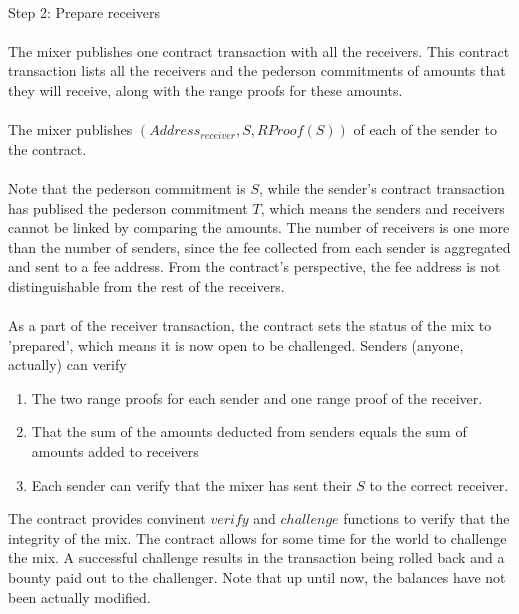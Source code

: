 \documentclass{article}
\begin{document}
\paragraph{}
Step 2: Prepare receivers
\paragraph{}
The mixer publishes one contract transaction with all the receivers. This contract transaction lists all the receivers and the pederson commitments of amounts that they will receive, along with the range proofs for these amounts. 
\paragraph{}
The mixer publishes $(Address_{receiver}, S, RProof(S))$ of each of the sender to the contract.
\paragraph{}
Note that the pederson commitment is $S$, while the sender's contract transaction has publised the pederson commitment $T$, which means the senders and receivers cannot be linked by comparing the amounts. 
The number of receivers is one more than the number of senders, since the fee collected from each sender is aggregated and sent to a fee address. From the contract's perspective, the fee address is not distinguishable from the rest of the receivers. 
\paragraph{}
As a part of the receiver transaction, the contract sets the status of the mix to 'prepared', which means it is now open to be challenged. Senders (anyone, actually) can verify 
\begin{enumerate}
\item The two range proofs for each sender and one range proof of the receiver.
\item That the sum of the amounts deducted from senders equals the sum of amounts added to receivers
\item Each sender can verify that the mixer has sent their $S$ to the correct receiver. 
\end{enumerate}
The contract provides convinent $verify$ and $challenge$ functions to verify that the integrity of the mix. The contract allows for some time for the world to challenge the mix. A successful challenge results in the transaction being rolled back and a bounty paid out to the challenger. Note that up until now, the balances have not been actually modified. 
\end{document}
